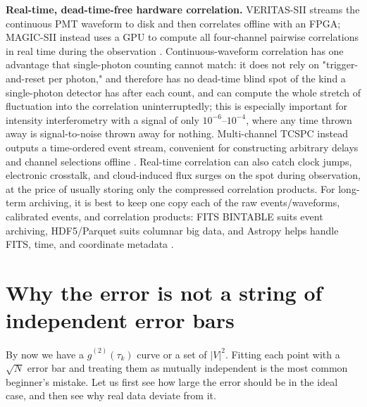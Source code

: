 \textbf{Real-time, dead-time-free hardware correlation.} VERITAS-SII streams the continuous PMT waveform to disk and then correlates offline with an FPGA; MAGIC-SII instead uses a GPU to compute all four-channel pairwise correlations in real time during the observation \citep{2020NatAs...4.1164A,2024MNRAS.529.4387A}. Continuous-waveform correlation has one advantage that single-photon counting cannot match: it does not rely on "trigger-and-reset per photon," and therefore has no dead-time blind spot of the kind a single-photon detector has after each count, and can compute the whole stretch of fluctuation into the correlation uninterruptedly; this is especially important for intensity interferometry with a signal of only $10^{-6}$--$10^{-4}$, where any time thrown away is signal-to-noise thrown away for nothing. Multi-channel TCSPC instead outputs a time-ordered event stream, convenient for constructing arbitrary delays and channel selections offline \citep{2020RScI...91a3108W}. Real-time correlation can also catch clock jumps, electronic crosstalk, and cloud-induced flux surges on the spot during observation, at the price of usually storing only the compressed correlation products. For long-term archiving, it is best to keep one copy each of the raw events/waveforms, calibrated events, and correlation products: FITS BINTABLE suits event archiving, HDF5/Parquet suits columnar big data, and Astropy helps handle FITS, time, and coordinate metadata \citep{2010A&A...524A..42P,2013A&A...558A..33A,2018AJ....156..123A}.

\section{Why the error is not a string of independent error bars}
\label{sec:e14-cov}

By now we have a $\widehat g^{(2)}(\tau_k)$ curve or a set of $|V|^2$. Fitting each point with a $\sqrt N$ error bar and treating them as mutually independent is the most common beginner's mistake. Let us first see how large the error should be in the ideal case, and then see why real data deviate from it.

